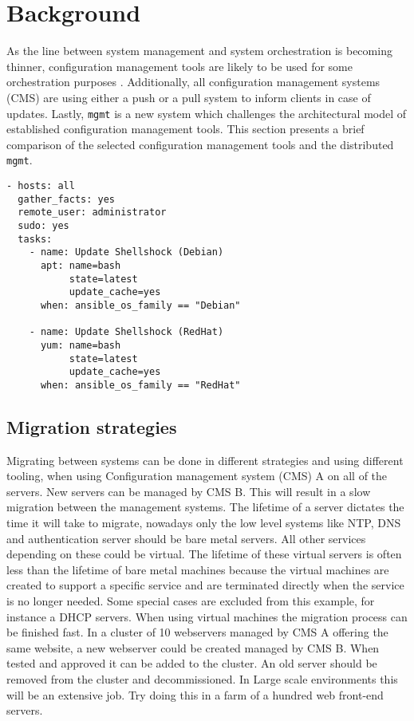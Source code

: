 \section{Background}\label{sec:background}
As the line between system management and system orchestration is becoming thinner, configuration management tools are likely to be used for some orchestration purposes \cite{papazoglou2003service}. Additionally, all configuration management systems (CMS) are using either a push or a pull system to inform clients in case of updates. Lastly, \texttt{mgmt} is a new system which challenges the architectural model of established configuration management tools. This section presents a brief comparison of the selected configuration management tools and the distributed \texttt{mgmt}.

\begin{lstlisting}[caption={Shellshock security patching with Ansible playbook},label=lst:shellshock]
- hosts: all
  gather_facts: yes
  remote_user: administrator
  sudo: yes
  tasks:
    - name: Update Shellshock (Debian)
      apt: name=bash
           state=latest
           update_cache=yes
      when: ansible_os_family == "Debian"
 
    - name: Update Shellshock (RedHat)
      yum: name=bash
           state=latest
           update_cache=yes
      when: ansible_os_family == "RedHat"
\end{lstlisting}

\subsection{Migration strategies}\label{subsec:migrationstrategies}
Migrating between systems can be done in different strategies and using different tooling, when using Configuration management system (CMS) A on all of the servers. New servers can be managed by CMS B. This will result in a slow migration between the management systems. The lifetime of a server dictates the time it will take to migrate, nowadays only the low level systems like NTP, DNS and authentication server should be bare metal servers. All other services depending on these could be virtual. The lifetime of these virtual servers is often less than the lifetime of bare metal machines because the virtual machines are created to support a specific service and are terminated directly when the service is no longer needed. Some special cases are excluded from this example, for instance a DHCP servers. When using virtual machines the migration process can be finished fast. In a cluster of 10 webservers managed by CMS A offering the same website, a new webserver could be created managed by CMS B. When tested and approved it can be added to the cluster. An old server should be removed from the cluster and decommissioned. In Large scale environments this will be an extensive job. Try doing this in a farm of a hundred web front-end servers.

